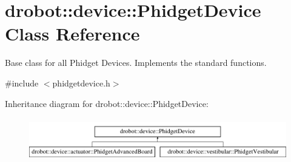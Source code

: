 \hypertarget{classdrobot_1_1device_1_1PhidgetDevice}{\section{drobot\-:\-:device\-:\-:Phidget\-Device Class Reference}
\label{classdrobot_1_1device_1_1PhidgetDevice}
}


Base class for all Phidget Devices. Implements the standard functions.  




{\ttfamily \#include $<$phidgetdevice.\-h$>$}

Inheritance diagram for drobot\-:\-:device\-:\-:Phidget\-Device\-:\begin{figure}[H]
\begin{center}
\leavevmode
\includegraphics[height=1.917808cm]{classdrobot_1_1device_1_1PhidgetDevice}
\end{center}
\end{figure}
